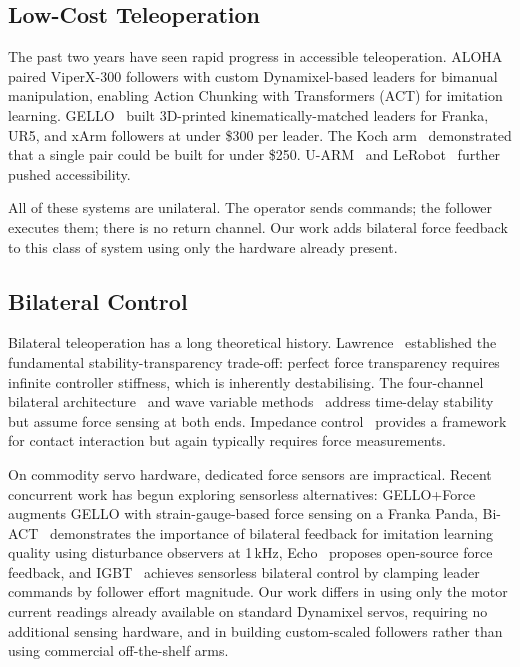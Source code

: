 \documentclass[conference]{IEEEtran}
\begin{document}
\subsection{Low-Cost Teleoperation}

The past two years have seen rapid progress in accessible teleoperation. ALOHA~\cite{zhao2023aloha} paired ViperX-300 followers with custom Dynamixel-based leaders for bimanual manipulation, enabling Action Chunking with Transformers (ACT) for imitation learning. GELLO~\cite{wu_2024_gello} built 3D-printed kinematically-matched leaders for Franka, UR5, and xArm followers at under \$300 per leader. The Koch arm~\cite{koch2024} demonstrated that a single pair could be built for under \$250. U-ARM~\cite{zou_2025_uarm} and LeRobot~\cite{lerobot2025} further pushed accessibility.

All of these systems are unilateral. The operator sends commands; the follower executes them; there is no return channel. Our work adds bilateral force feedback to this class of system using only the hardware already present.

\subsection{Bilateral Control}

Bilateral teleoperation has a long theoretical history. Lawrence~\cite{lawrence_1993_stability} established the fundamental stability-transparency trade-off: perfect force transparency requires infinite controller stiffness, which is inherently destabilising. The four-channel bilateral architecture~\cite{hokayem2006} and wave variable methods~\cite{anderson1989} address time-delay stability but assume force sensing at both ends. Impedance control~\cite{hogan1985} provides a framework for contact interaction but again typically requires force measurements.

On commodity servo hardware, dedicated force sensors are impractical. Recent concurrent work has begun exploring sensorless alternatives: GELLO+Force~\cite{sujit_2025_improving} augments GELLO with strain-gauge-based force sensing on a Franka Panda, Bi-ACT~\cite{kobayashi2024} demonstrates the importance of bilateral feedback for imitation learning quality using disturbance observers at 1\,kHz, Echo~\cite{echo2025} proposes open-source force feedback, and IGBT~\cite{kanai2025} achieves sensorless bilateral control by clamping leader commands by follower effort magnitude. Our work differs in using only the motor current readings already available on standard Dynamixel servos, requiring no additional sensing hardware, and in building custom-scaled followers rather than using commercial off-the-shelf arms.
\end{document}
